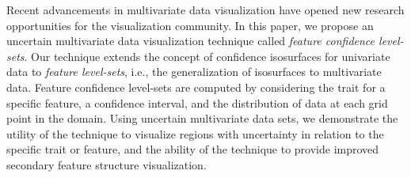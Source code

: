 %
Recent advancements in multivariate data visualization have opened new research opportunities for the visualization community.
%
In this paper, we propose 
an uncertain multivariate data visualization technique called \textit{feature confidence level-sets}.
%
Our technique extends the concept of confidence isosurfaces for univariate data to \textit{feature level-sets}, i.e., the generalization of isosurfaces to multivariate data.
%
Feature confidence level-sets are computed by considering the trait for a specific feature, a confidence interval, and the distribution of data at each grid point in the domain.
%
%
Using uncertain multivariate data sets, we demonstrate the utility of the technique to visualize regions with uncertainty in relation to the specific trait or feature, and the ability of the technique to provide improved secondary feature structure visualization.
%
